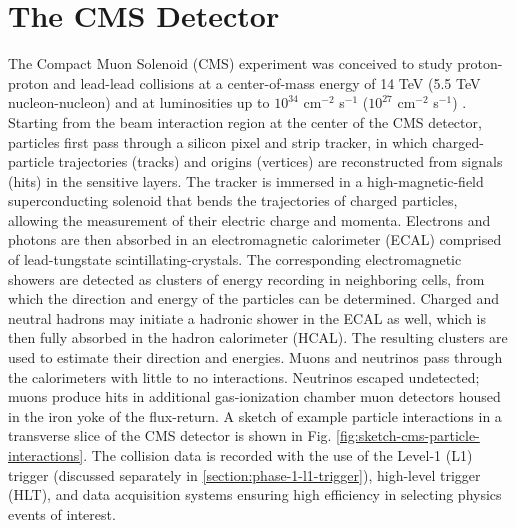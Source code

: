 \section{The CMS Detector}
\label{section:cms-detector}

The Compact Muon Solenoid (CMS) experiment was conceived to study proton-proton and lead-lead collisions at a center-of-mass energy of 14 TeV (5.5 TeV nucleon-nucleon) and at luminosities up to $10^{34}$ cm$^{-2}$ s$^{-1}$ ($10^{27}$ cm$^{-2}$ s$^{-1}$) \cite{CMS-2008-JINST-3-S08004} \cite{CERN-EP-2017-110}. Starting from the beam interaction region at the center of the CMS detector, particles first pass through a silicon pixel and strip tracker, in which charged-particle trajectories (tracks) and origins (vertices) are reconstructed from signals (hits) in the sensitive layers. The tracker is immersed in a high-magnetic-field superconducting solenoid that bends the trajectories of charged particles, allowing the measurement of their electric charge and momenta. Electrons and photons are then absorbed in an electromagnetic calorimeter (ECAL) comprised of lead-tungstate scintillating-crystals. The corresponding electromagnetic showers are detected as clusters of energy recording in neighboring cells, from which the direction and energy of the particles can be determined. Charged and neutral hadrons may initiate a hadronic shower in the ECAL as well, which is then fully absorbed in the hadron calorimeter (HCAL). The resulting clusters are used to estimate their direction and energies. Muons and neutrinos pass through the calorimeters with little to no interactions. Neutrinos escaped undetected; muons produce hits in additional gas-ionization chamber muon detectors housed in the iron yoke of the flux-return. A sketch of example particle interactions in a transverse slice of the CMS detector is shown in Fig. \ref{fig:sketch-cms-particle-interactions}. The collision data is recorded with the use of the Level-1 (L1) trigger (discussed separately in \ref{section:phase-1-l1-trigger}), high-level trigger (HLT), and data acquisition systems ensuring high efficiency in selecting physics events of interest. 

